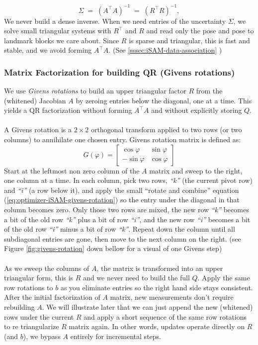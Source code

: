 $$
\Sigma \;=\; (A^\top A)^{-1} \;=\; (R^\top R)^{-1},
$$
We never build a dense inverse. When we need entries of the uncertainty $\Sigma$, we solve small triangular systems with $R^\top$ and $R$ and read only the pose and pose to landmark blocks we care about. Since $R$ is sparse and triangular, this is fast and stable, and we avoid forming $A^\top A$. (See  \ref{sssec:iSAM-data-association} )



\subsubsection{Matrix Factorization for building QR (Givens rotations)}
We use \emph{Givens rotations} to build an upper triangular factor $R$ from the (whitened) Jacobian $A$ by zeroing entries below the diagonal, one at a time. This yields a QR factorization without forming $A^\top A$ and without explicitly storing $Q$.
\\ \\
A Givens rotation is a $2\times 2$ orthogonal transform applied to two rows (or two columns) to annihilate one chosen entry. Givens rotation matrix is defined as:
\begin{equation}
    G(\varphi) =
    \begin{bmatrix}
        \cos\varphi & \sin\varphi \\
        -\sin\varphi & \cos\varphi
    \end{bmatrix}
    \label{eq:optimizer-iSAM-givens-rotation}
\end{equation}
Start at the leftmost non zero column of the $A$ matrix and sweep to the right, one column at a time. In each column, pick two rows, \textit{``k''} (the current pivot row) and \textit{``i''} (a row below it), and apply the small ``rotate and combine'' equation (\ref{eq:optimizer-iSAM-givens-rotation}) so the entry under the diagonal in that column becomes zero. Only those two rows are mixed, the new row \textit{``k''} becomes a bit of the old row \textit{``k''} plus a bit of row \textit{``i''}, and the new row \textit{``i''} becomes a bit of the old row \textit{``i''} minus a bit of row \textit{``k''}. Repeat down the column until all subdiagonal entries are gone, then move to the next column on the right. (see Figure \ref{fig:givens-rotation} down bellow for a visual of one Givens step)
\\ \\
As we sweep the columns of $A$, the matrix is transformed into an upper triangular form, this is $R$ and we never need to build the full $Q$. Apply the same row rotations to $b$ as you eliminate entries so the right hand side stays consistent. After the initial factorization of $A$ matrix, new measurements don't require rebuilding $A$. We will illustrate later that we can just append the new (whitened) rows under the current $R$ and apply a short sequence of the same row rotations to re triangularize $R$ matrix again. In other words, updates operate directly on $R$ (and $b$), we bypass $A$ entirely for incremental steps.
